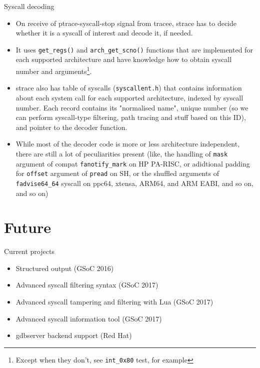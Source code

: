 \documentclass[unicode,aspectratio=169]{beamer}
\begin{document}
\begin{frame}{Syscall decoding}
\small
\begin{itemize}
	\item On receive of ptrace-syscall-stop signal from tracee, strace has to decide whether it is a syscall of interest and decode it, if needed.
	\item It uses \texttt{get\_regs()} and \texttt{arch\_get\_scno()} functions that are implemented for each supported architecture and have knowledge how to obtain syscall number and arguments\footnote{Except when they don't, see \texttt{int\_0x80} test, for example}.
	\item strace also has table of syscalls (\texttt{syscallent.h}) that contains information about each system call for each supported architecture, indexed by syscall number. Each record contains its "normalised name", unique number (so we can perform syscall-type filtering, path tracing and stuff based on this ID), and pointer to the decoder function.
	\item While most of the decoder code is more or less architecture independent, there are still a lot of peculiarities present (like, the handling of \texttt{mask} argument of compat \texttt{fanotify\_mark} on HP PA-RISC, or adidtional padding for \texttt{offset} argument of \texttt{pread} on SH, or the shuffled arguments of \texttt{fadvise64\_64} syscall on ppc64, xtensa, ARM64, and ARM EABI, and so on, and so on)
\end{itemize}
\end{frame}

\section{Future}

\begin{frame}{Current projects}
\begin{itemize}
	\item Structured output (GSoC 2016)
	\item Advanced syscall filtering syntax (GSoC 2017)
	\item Advanced syscall tampering and filtering with Lua (GSoC 2017)
	\item Advanced syscall information tool (GSoC 2017)
	\item gdbserver backend support (Red Hat)
\end{itemize}
\end{frame}
\end{document}
